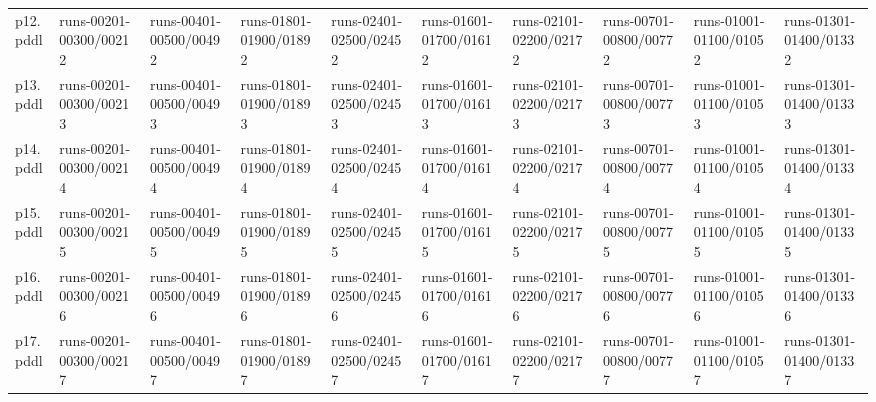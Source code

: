 \documentclass{article}
\begin{document}
\begin{tabular}{@{}lrrrrrrrrr@{}}
p12.pddl & \multicolumn{1}{|l|}{runs-00201-00300/00212} & \multicolumn{1}{|l|}{runs-00401-00500/00492} & \multicolumn{1}{|l|}{runs-01801-01900/01892} & \multicolumn{1}{|l|}{runs-02401-02500/02452} & \multicolumn{1}{|l|}{runs-01601-01700/01612} & \multicolumn{1}{|l|}{runs-02101-02200/02172} & \multicolumn{1}{|l|}{runs-00701-00800/00772} & \multicolumn{1}{|l|}{runs-01001-01100/01052} & \multicolumn{1}{|l|}{runs-01301-01400/01332} \\
p13.pddl & \multicolumn{1}{|l|}{runs-00201-00300/00213} & \multicolumn{1}{|l|}{runs-00401-00500/00493} & \multicolumn{1}{|l|}{runs-01801-01900/01893} & \multicolumn{1}{|l|}{runs-02401-02500/02453} & \multicolumn{1}{|l|}{runs-01601-01700/01613} & \multicolumn{1}{|l|}{runs-02101-02200/02173} & \multicolumn{1}{|l|}{runs-00701-00800/00773} & \multicolumn{1}{|l|}{runs-01001-01100/01053} & \multicolumn{1}{|l|}{runs-01301-01400/01333} \\
p14.pddl & \multicolumn{1}{|l|}{runs-00201-00300/00214} & \multicolumn{1}{|l|}{runs-00401-00500/00494} & \multicolumn{1}{|l|}{runs-01801-01900/01894} & \multicolumn{1}{|l|}{runs-02401-02500/02454} & \multicolumn{1}{|l|}{runs-01601-01700/01614} & \multicolumn{1}{|l|}{runs-02101-02200/02174} & \multicolumn{1}{|l|}{runs-00701-00800/00774} & \multicolumn{1}{|l|}{runs-01001-01100/01054} & \multicolumn{1}{|l|}{runs-01301-01400/01334} \\
p15.pddl & \multicolumn{1}{|l|}{runs-00201-00300/00215} & \multicolumn{1}{|l|}{runs-00401-00500/00495} & \multicolumn{1}{|l|}{runs-01801-01900/01895} & \multicolumn{1}{|l|}{runs-02401-02500/02455} & \multicolumn{1}{|l|}{runs-01601-01700/01615} & \multicolumn{1}{|l|}{runs-02101-02200/02175} & \multicolumn{1}{|l|}{runs-00701-00800/00775} & \multicolumn{1}{|l|}{runs-01001-01100/01055} & \multicolumn{1}{|l|}{runs-01301-01400/01335} \\
p16.pddl & \multicolumn{1}{|l|}{runs-00201-00300/00216} & \multicolumn{1}{|l|}{runs-00401-00500/00496} & \multicolumn{1}{|l|}{runs-01801-01900/01896} & \multicolumn{1}{|l|}{runs-02401-02500/02456} & \multicolumn{1}{|l|}{runs-01601-01700/01616} & \multicolumn{1}{|l|}{runs-02101-02200/02176} & \multicolumn{1}{|l|}{runs-00701-00800/00776} & \multicolumn{1}{|l|}{runs-01001-01100/01056} & \multicolumn{1}{|l|}{runs-01301-01400/01336} \\
p17.pddl & \multicolumn{1}{|l|}{runs-00201-00300/00217} & \multicolumn{1}{|l|}{runs-00401-00500/00497} & \multicolumn{1}{|l|}{runs-01801-01900/01897} & \multicolumn{1}{|l|}{runs-02401-02500/02457} & \multicolumn{1}{|l|}{runs-01601-01700/01617} & \multicolumn{1}{|l|}{runs-02101-02200/02177} & \multicolumn{1}{|l|}{runs-00701-00800/00777} & \multicolumn{1}{|l|}{runs-01001-01100/01057} & \multicolumn{1}{|l|}{runs-01301-01400/01337} \\

\end{tabular}
\end{document}

